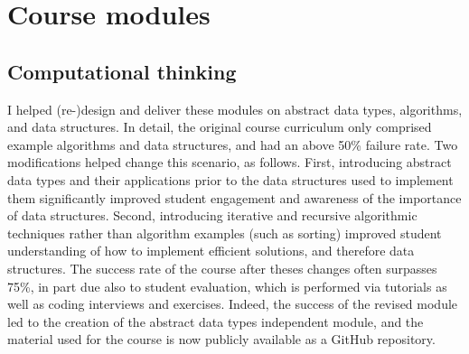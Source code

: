 
\section{Course modules}

\subsection{Computational thinking}

%
{I helped (re-)design and deliver these modules on abstract data types, algorithms, and data structures. In detail, the original course curriculum only comprised example algorithms and data structures, and had an above 50\% failure rate. Two modifications helped change this scenario, as follows. First, introducing abstract data types and their applications prior to the data structures used to implement them significantly improved student engagement and awareness of the importance of data structures. Second, introducing iterative and recursive algorithmic techniques rather than algorithm examples (such as sorting) improved student understanding of how to implement efficient solutions, and therefore data structures. The success rate of the course after theses changes often surpasses 75\%, in part due also to student evaluation, which is performed via tutorials as well as coding interviews and exercises. Indeed, the success of the revised module led to the creation of the abstract data types independent module, and the material used for the course is now publicly available as a GitHub repository.}

\cvline{}{\hrule}


